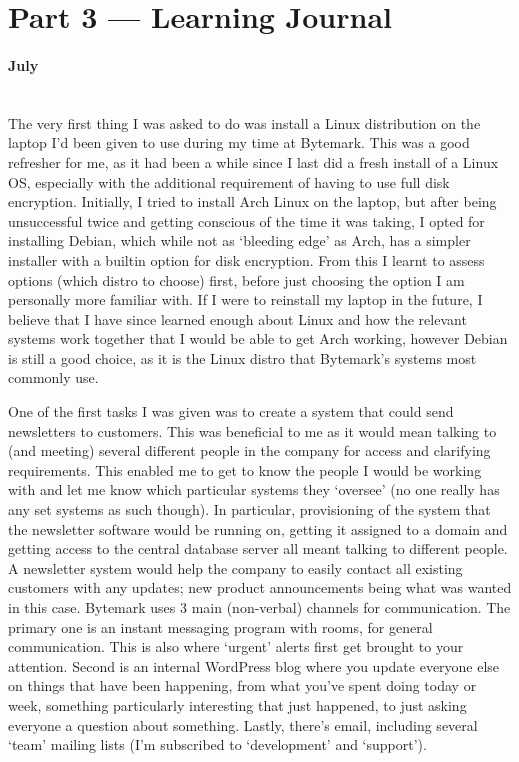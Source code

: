 \documentclass[12pt,a4paper]{article}
\newcommand{\paragraphnl}[1]{\paragraph{#1}\mbox{}\\}
\begin{document}
\section*{Part 3 --- Learning Journal}
\paragraphnl{July}
	The very first thing I was asked to do was install a Linux distribution on
	the laptop I'd been given to use during my time at Bytemark. This was a
	good refresher for me, as it had been a while since I last did a fresh
	install of a Linux OS, especially with the additional requirement of having
	to use full disk encryption. Initially, I tried to install Arch Linux on
	the laptop, but after being unsuccessful twice and getting conscious of the
	time it was taking, I opted for installing Debian, which while not as
	`bleeding edge' as Arch, has a simpler installer with a builtin option for
	disk encryption. From this I learnt to assess options (which distro to
	choose) first, before just choosing the option I am personally more
	familiar with. If I were to reinstall my laptop in the future, I believe
	that I have since learned enough about Linux and how the relevant systems
	work together that I would be able to get Arch working, however Debian is
	still a good choice, as it is the Linux distro that Bytemark's systems most
	commonly use.

	One of the first tasks I was given was to create a system that could send
	newsletters to customers. This was beneficial to me as it would mean
	talking to (and meeting) several different people in the company for access
	and clarifying requirements. This enabled me to get to know the people I
	would be working with and let me know which particular systems they
	`oversee' (no one really has any set systems as such though). In
	particular, provisioning of the system that the newsletter software would
	be running on, getting it assigned to a domain and getting access to the
	central database server all meant talking to different people. A newsletter
	system would help the company to easily contact all existing customers with
	any updates; new product announcements being what was wanted in this case.
	Bytemark uses 3 main (non-verbal) channels for communication. The primary
	one is an instant messaging program with rooms, for general communication.
	This is also where `urgent' alerts first get brought to your attention.
	Second is an internal WordPress blog where you update everyone else on
	things that have been happening, from what you've spent doing today or
	week, something particularly interesting that just happened, to just asking
	everyone a question about something. Lastly, there's email, including
	several `team' mailing lists (I'm subscribed to `development' and
	`support').
\end{document}
